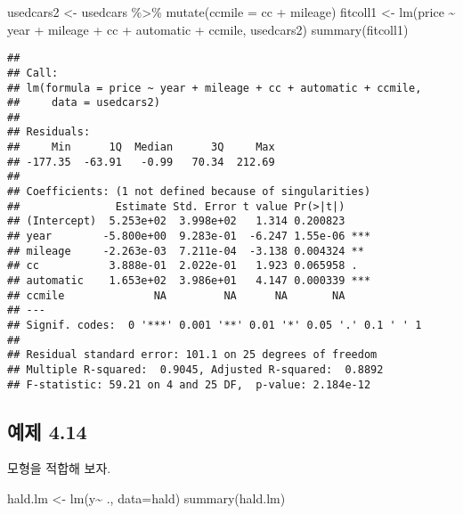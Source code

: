 \documentclass[
]{book}
\newenvironment{Shaded}{\begin{snugshade}}{\end{snugshade}}
\newcommand{\AttributeTok}[1]{\textcolor[rgb]{0.77,0.63,0.00}{#1}}
\newcommand{\FunctionTok}[1]{\textcolor[rgb]{0.00,0.00,0.00}{#1}}
\newcommand{\NormalTok}[1]{#1}
\newcommand{\OtherTok}[1]{\textcolor[rgb]{0.56,0.35,0.01}{#1}}
\newcommand{\SpecialCharTok}[1]{\textcolor[rgb]{0.00,0.00,0.00}{#1}}
\begin{document}
\begin{Shaded}
\begin{Highlighting}[]
\NormalTok{usedcars2 }\OtherTok{\textless{}{-}}\NormalTok{ usedcars }\SpecialCharTok{\%\textgreater{}\%}  \FunctionTok{mutate}\NormalTok{(}\AttributeTok{ccmile =}\NormalTok{ cc }\SpecialCharTok{+}\NormalTok{ mileage)}
\NormalTok{fitcoll1 }\OtherTok{\textless{}{-}} \FunctionTok{lm}\NormalTok{(price }\SpecialCharTok{\textasciitilde{}}\NormalTok{ year }\SpecialCharTok{+}\NormalTok{ mileage }\SpecialCharTok{+}\NormalTok{ cc }\SpecialCharTok{+}\NormalTok{ automatic }\SpecialCharTok{+}\NormalTok{ ccmile, usedcars2)}
\FunctionTok{summary}\NormalTok{(fitcoll1)}
\end{Highlighting}
\end{Shaded}

\begin{verbatim}
## 
## Call:
## lm(formula = price ~ year + mileage + cc + automatic + ccmile, 
##     data = usedcars2)
## 
## Residuals:
##     Min      1Q  Median      3Q     Max 
## -177.35  -63.91   -0.99   70.34  212.69 
## 
## Coefficients: (1 not defined because of singularities)
##               Estimate Std. Error t value Pr(>|t|)    
## (Intercept)  5.253e+02  3.998e+02   1.314 0.200823    
## year        -5.800e+00  9.283e-01  -6.247 1.55e-06 ***
## mileage     -2.263e-03  7.211e-04  -3.138 0.004324 ** 
## cc           3.888e-01  2.022e-01   1.923 0.065958 .  
## automatic    1.653e+02  3.986e+01   4.147 0.000339 ***
## ccmile              NA         NA      NA       NA    
## ---
## Signif. codes:  0 '***' 0.001 '**' 0.01 '*' 0.05 '.' 0.1 ' ' 1
## 
## Residual standard error: 101.1 on 25 degrees of freedom
## Multiple R-squared:  0.9045, Adjusted R-squared:  0.8892 
## F-statistic: 59.21 on 4 and 25 DF,  p-value: 2.184e-12
\end{verbatim}

\hypertarget{uxc608uxc81c-4.14}{%
\subsection{예제 4.14}\label{uxc608uxc81c-4.14}}

모형을 적합해 보자.

\begin{Shaded}
\begin{Highlighting}[]
\NormalTok{hald.lm }\OtherTok{\textless{}{-}} \FunctionTok{lm}\NormalTok{(y}\SpecialCharTok{\textasciitilde{}}\NormalTok{ ., }\AttributeTok{data=}\NormalTok{hald)}
\FunctionTok{summary}\NormalTok{(hald.lm)}
\end{Highlighting}
\end{Shaded}
\end{document}
